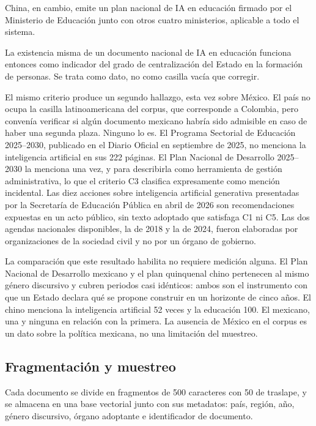 China, en cambio, emite un plan nacional de IA en educación firmado por el Ministerio de Educación junto con otros cuatro ministerios, aplicable a todo el sistema.

La existencia misma de un documento nacional de IA en educación funciona entonces como indicador del grado de centralización del Estado en la formación de personas. Se trata como dato, no como casilla vacía que corregir.

El mismo criterio produce un segundo hallazgo, esta vez sobre México. El país no ocupa la casilla latinoamericana del corpus, que corresponde a Colombia, pero convenía verificar si algún documento mexicano habría sido admisible en caso de haber una segunda plaza. Ninguno lo es. El Programa Sectorial de Educación 2025--2030, publicado en el Diario Oficial en septiembre de 2025, no menciona la inteligencia artificial en sus 222 páginas. El Plan Nacional de Desarrollo 2025--2030 la menciona una vez, y para describirla como herramienta de gestión administrativa, lo que el criterio C3 clasifica expresamente como mención incidental. Las diez acciones sobre inteligencia artificial generativa presentadas por la Secretaría de Educación Pública en abril de 2026 son recomendaciones expuestas en un acto público, sin texto adoptado que satisfaga C1 ni C5. Las dos agendas nacionales disponibles, la de 2018 y la de 2024, fueron elaboradas por organizaciones de la sociedad civil y no por un órgano de gobierno.

La comparación que este resultado habilita no requiere medición alguna. El Plan Nacional de Desarrollo mexicano y el plan quinquenal chino pertenecen al mismo género discursivo y cubren periodos casi idénticos: ambos son el instrumento con que un Estado declara qué se propone construir en un horizonte de cinco años. El chino menciona la inteligencia artificial 52 veces y la educación 100. El mexicano, una y ninguna en relación con la primera. La ausencia de México en el corpus es un dato sobre la política mexicana, no una limitación del muestreo.

\subsection{Fragmentación y muestreo}

Cada documento se divide en fragmentos de 500 caracteres con 50 de traslape, y se almacena en una base vectorial junto con sus metadatos: país, región, año, género discursivo, órgano adoptante e identificador de documento.

